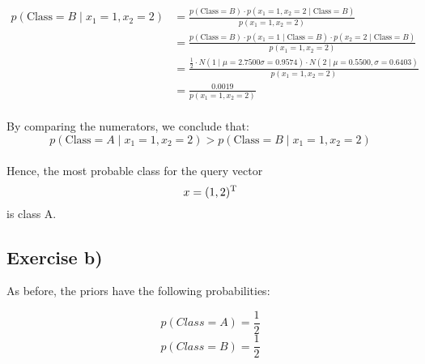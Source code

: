 \documentclass{article}
\begin{document}
\begin{align*}
    p(\text{Class} = B \mid x_1 = 1, x_2 = 2) 
    &= \frac{p(\text{Class} = B) \cdot p(x_1 = 1, x_2 = 2 \mid \text{Class} = B)}{p(x_1 = 1, x_2 = 2)} \\
    &= \frac{p(\text{Class} = B) \cdot p(x_1 = 1 \mid \text{Class} = B) \cdot p(x_2 = 2 \mid \text{Class} = B)}{p(x_1 = 1, x_2 = 2)} \\
    &= \frac{\frac{1}{2} \cdot N(1 \mid \mu = 2.7500\sigma = 0.9574) \cdot N(2 \mid \mu = 0.5500, \sigma = 0.6403)}{p(x_1 = 1, x_2 = 2)} \\
    &= \frac{0.0019}{p(x_1 = 1, x_2 = 2)}
\end{align*}
\\
By comparing the numerators, we conclude that:
$$p(\text{Class} = A \mid x_1 = 1, x_2 = 2) > p(\text{Class} = B \mid x_1 = 1, x_2 = 2)$$
\\
Hence, the most probable class for the query vector $$x = (1, 2)\textsuperscript{T}$$ is class A.
\newpage



\subsection{Exercise b)}
As before, the priors have the following probabilities:

$$p(Class = A) = \frac{1}{2}$$
$$p(Class = B) = \frac{1}{2}$$
\end{document}
